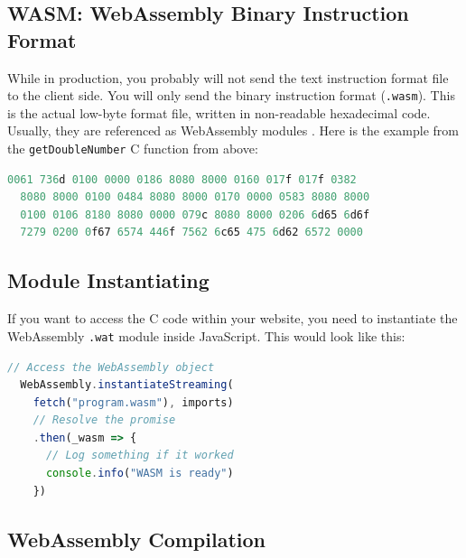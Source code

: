 \documentclass[10pt]{article}
\begin{document}
\begin{sloppypar}
  \subsection{WASM: WebAssembly Binary Instruction Format}
  \label{sec:webassembly-binary-instruction-format}

  While in production, you probably will not send the text instruction format file to the client side. You will only send the binary instruction format (\lstinline{.wasm}). This is the actual low-byte format file, written in non-readable hexadecimal code. Usually, they are referenced as WebAssembly modules \citep{mozilla_webassembly_2023}. Here is the example from the \lstinline{getDoubleNumber} C function from above:

  \pagebreak

  \vspace{7pt}
  \begin{lstlisting}[language=C, caption=Code example from above compiled into the WebAssembly \\ Binary Instruction Format., label=lst:binary-example]
  0061 736d 0100 0000 0186 8080 8000 0160 017f 017f 0382
  8080 8000 0100 0484 8080 8000 0170 0000 0583 8080 8000
  0100 0106 8180 8080 0000 079c 8080 8000 0206 6d65 6d6f
  7279 0200 0f67 6574 446f 7562 6c65 475 6d62 6572 0000\end{lstlisting}

  \subsection{Module Instantiating}
  \label{sec:module-instantiating}

  If you want to access the C code within your website, you need to instantiate the WebAssembly \lstinline{.wat} module inside JavaScript. This would look like this:

  \vspace{7pt}
  \begin{lstlisting}[language=JavaScript, caption=Instantiate the \lstinline{.wasm} module in JavaScript., label=lst:javascript-example]
  // Access the WebAssembly object
  WebAssembly.instantiateStreaming(
    fetch("program.wasm"), imports)
    // Resolve the promise
    .then(_wasm => {
      // Log something if it worked
      console.info("WASM is ready")
    })\end{lstlisting}

  \subsection{WebAssembly Compilation}
  \label{sec:webassembly-compilation}


\end{sloppypar}
\end{document}
